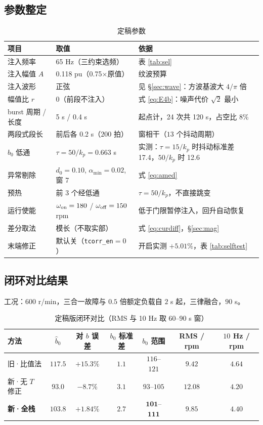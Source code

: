 \documentclass[11pt,a4paper]{ctexart}
\begin{document}
\subsection{参数整定}

\begin{table}[H]
\centering
\caption{定稿参数}
\label{tab:param}
\small
\begin{tabular}{lll}
\toprule
项目 & 取值 & 依据\\
\midrule
注入频率 & 65 Hz（三约束选频） & 表 \ref{tab:sel}\\
注入幅值 $A$ & 0.118 pu（0.75$\times$原值） & 纹波预算\\
注入波形 & 正弦 & 见 \S\ref{sec:wave}：方波基波大 $4/\pi$ 倍\\
幅值比 $r$ & $0$（前段不注入） & 式 \eqref{eq:E4b}：噪声代价 $\sqrt2$ 最小\\
burst 周期 / 长度 & 5 s / 0.4 s & 起点计，24 次共 120 s，占空比 8\%\\
两段式段长 & 前后各 0.2 s（$200$ 拍） & 窗相干（$13$ 个抖动周期）\\
$b_0$ 低通 & $\tau=50/k_p=0.663$ s & 实测：$\tau=15/k_p$ 时抖动标准差 17.4，$50/k_p$ 时 12.6\\
异常剔除 & $d_0=0.10$, $\alpha_{\min}=0.02$, 窗 7 & 式 \eqref{eq:amed}\\
预热 & 前 3 个经低通 & $\tau=50/k_p$，不直接跳变\\
运行使能 & $\omega_{\rm on}=180$ / $\omega_{\rm off}=150$ rpm & 低于门限暂停注入，回升自动恢复\\

差分取法 & 模长（不取实部） & 式 \eqref{eq:curdiff}，\S\ref{sec:mag}\\
末端修正 & 默认关（\texttt{tcorr\_en}$=0$） & 开启实测 $+5.01\%$，表 \ref{tab:selftest}\\
\bottomrule
\end{tabular}
\end{table}

\subsection{闭环对比结果}

工况：$600$ r/min，三合一故障与 $0.5$ 倍额定负载自 $2$ s 起，三律融合，$90$ s。

\begin{table}[H]
\centering
\caption{定稿版闭环对比（RMS 与 10 Hz 取 $60$–$90$ s 窗）}
\label{tab:final}
\begin{tabular}{lcccccc}
\toprule
方法 & $\hat b_0$ & 对 $b$ 误差 & $b_0$ 标准差 & $b_0$ 范围 & RMS / rpm & $10$ Hz / rpm\\
\midrule
旧·比值法 & $117.5$ & $+15.3\%$ & $1.1$ & $116$–$121$ & $9.42$ & $4.64$\\
新·无 $T$ 修正 & $93.0$ & $-8.7\%$ & $3.1$ & $93$–$105$ & $12.08$ & $4.20$\\
\textbf{新·全栈} & $\bm{103.8}$ & $\bm{+1.84\%}$ & $2.7$ & $\bm{101}$–$\bm{111}$ & $9.85$ & $4.40$\\
\bottomrule
\end{tabular}
\end{table}
\end{document}
